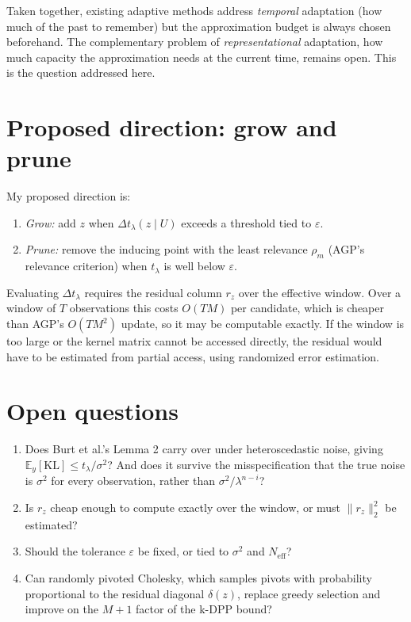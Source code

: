 \documentclass[11pt,a4paper]{article}
\theoremstyle{definition}
\theoremstyle{remark}
\newcommand{\KL}{\mathrm{KL}}
\newcommand{\Neff}{N_{\mathrm{eff}}}
\begin{document}
Taken together, existing adaptive methods address \emph{temporal} adaptation (how much of the past to remember) but the approximation budget is always chosen beforehand. The complementary problem of \emph{representational} adaptation, how much capacity the approximation needs at the current time, remains open. This is the question addressed here.

\section{Proposed direction: grow and prune}

My proposed direction is:
\begin{enumerate}
  \item \emph{Grow:} add $z$ when $\Delta t_\lambda(z \mid U)$ exceeds a threshold tied to $\varepsilon$.
  \item \emph{Prune:} remove the inducing point with the least relevance $\rho_m$ (AGP's relevance criterion) when $t_\lambda$ is well below $\varepsilon$.
\end{enumerate}
Evaluating $\Delta t_\lambda$ requires the residual column $r_z$ over the effective window. Over a window of $T$ observations this costs $O(TM)$ per candidate, which is cheaper than AGP's $O(TM^2)$ update, so it may be computable exactly. If the window is too large or the kernel matrix cannot be accessed directly, the residual would have to be estimated from partial access, using randomized error estimation.

\section{Open questions}

\begin{enumerate}
  \item Does Burt et al.'s Lemma 2 carry over under heteroscedastic noise, giving $\mathbb{E}_y[\KL] \leq t_\lambda/\sigma^2$? And does it survive the misspecification that the true noise is $\sigma^2$ for every observation, rather than $\sigma^2/\lambda^{n-i}$?
  \item Is $r_z$ cheap enough to compute exactly over the window, or must $\|r_z\|_2^2$ be estimated?
  \item Should the tolerance $\varepsilon$ be fixed, or tied to $\sigma^2$ and $\Neff$?
  \item Can randomly pivoted Cholesky, which samples pivots with probability proportional to the residual diagonal $\delta(z)$, replace greedy selection and improve on the $M+1$ factor of the k-DPP bound?
\end{enumerate}
\end{document}
